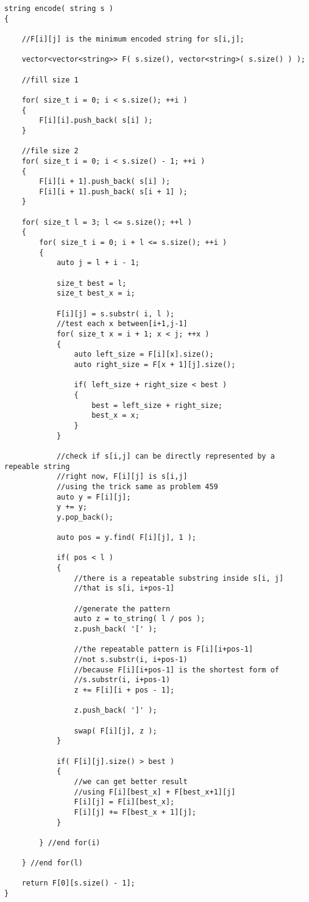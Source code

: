 \setcounter{lstlisting}{0}
\begin{lstlisting}[style=customc, caption={Dynamic Programming}]
string encode( string s )
{

    //F[i][j] is the minimum encoded string for s[i,j];

    vector<vector<string>> F( s.size(), vector<string>( s.size() ) );

    //fill size 1

    for( size_t i = 0; i < s.size(); ++i )
    {
        F[i][i].push_back( s[i] );
    }

    //file size 2
    for( size_t i = 0; i < s.size() - 1; ++i )
    {
        F[i][i + 1].push_back( s[i] );
        F[i][i + 1].push_back( s[i + 1] );
    }

    for( size_t l = 3; l <= s.size(); ++l )
    {
        for( size_t i = 0; i + l <= s.size(); ++i )
        {
            auto j = l + i - 1;

            size_t best = l;
            size_t best_x = i;

            F[i][j] = s.substr( i, l );
            //test each x between[i+1,j-1]
            for( size_t x = i + 1; x < j; ++x )
            {
                auto left_size = F[i][x].size();
                auto right_size = F[x + 1][j].size();

                if( left_size + right_size < best )
                {
                    best = left_size + right_size;
                    best_x = x;
                }
            }

            //check if s[i,j] can be directly represented by a repeable string
            //right now, F[i][j] is s[i,j]
            //using the trick same as problem 459
            auto y = F[i][j];
            y += y;
            y.pop_back();

            auto pos = y.find( F[i][j], 1 );

            if( pos < l )
            {
                //there is a repeatable substring inside s[i, j]
                //that is s[i, i+pos-1]

                //generate the pattern
                auto z = to_string( l / pos );
                z.push_back( '[' );

                //the repeatable pattern is F[i][i+pos-1]
                //not s.substr(i, i+pos-1)
                //because F[i][i+pos-1] is the shortest form of
                //s.substr(i, i+pos-1)
                z += F[i][i + pos - 1];

                z.push_back( ']' );

                swap( F[i][j], z );
            }

            if( F[i][j].size() > best )
            {
                //we can get better result
                //using F[i][best_x] + F[best_x+1][j]
                F[i][j] = F[i][best_x];
                F[i][j] += F[best_x + 1][j];
            }

        } //end for(i)

    } //end for(l)

    return F[0][s.size() - 1];
}
\end{lstlisting}